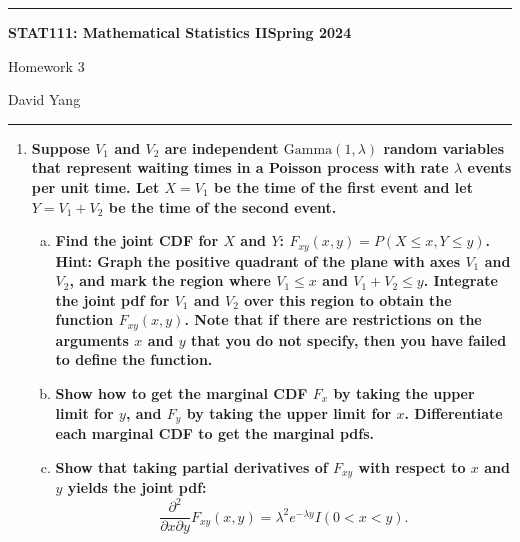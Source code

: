 \documentclass[11pt]{article}
\begin{document}
	\hrule
	\begin{center}
        \textbf{STAT111: Mathematical Statistics II}\hfill \textbf{Spring 2024}\newline

		{\Large Homework 3}

		David Yang
	\end{center}

\hrule

\vspace{1em}

\begin{enumerate}
    \item \textbf{Suppose $V_1$ and $V_2$ are independent $\mathrm{Gamma}(1, \lambda)$ random variables that represent waiting
    times in a Poisson process with rate $\lambda$ events per unit time. Let $X = V_1$ be the time of the
    first event and let $Y = V_1 + V_2$ be the time of the second event.}

    \begin{enumerate}[a)]
      \item \textbf{Find the joint CDF for $X$ and $Y$: $F_{xy}(x, y) = P(X \leq x, Y \leq y)$. Hint: Graph the positive quadrant of the plane
      with axes $V_1$ and $V_2$, and mark the region where $V_1 \leq x$ and $V_1 + V_2 \leq y$. Integrate the joint pdf for $V_1$ and $V_2$ over this region to obtain the function $F_{xy}(x, y)$.
      Note that if there are restrictions on the arguments $x$ and $y$ that you do not specify, then you have failed to define the function.}
      \item \textbf{Show how to get the marginal CDF $F_x$ by taking the upper limit for $y$, and $F_y$ by taking the upper limit for $x$. Differentiate each marginal CDF to get the marginal pdfs.}
      \item \textbf{Show that taking partial derivatives of $F_{xy}$ with respect to $x$ and $y$ yields the joint pdf:}
      \[
        \frac{\partial^2}{\partial x \partial y}F_{xy}(x, y) = \lambda^2 e^{-\lambda y}I(0< x < y). 
      \]
    \end{enumerate}


\end{enumerate}
\end{document}
